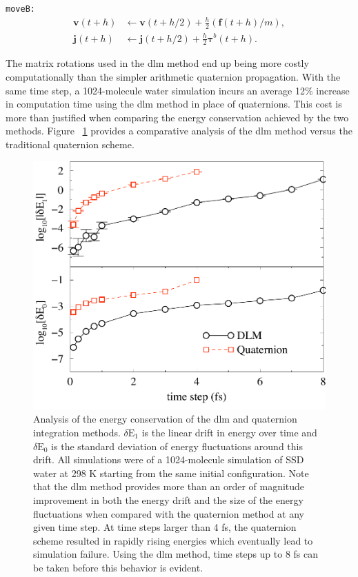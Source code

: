 \documentclass[]{book}
\begin{document}
{\tt moveB:}
\begin{align*}
\mathbf{v}\left(t + h \right)  &\leftarrow  \mathbf{v}\left(t + h / 2 \right) 
	+ \frac{h}{2} \left( \mathbf{f}(t + h) / m \right), \\
%
\mathbf{j}\left(t + h \right)  &\leftarrow \mathbf{j}\left(t + h / 2 \right) 
	+ \frac{h}{2} \mathbf{\tau}^b(t + h) .
\end{align*}

The matrix rotations used in the {\sc dlm} method end up being more
costly computationally than the simpler arithmetic quaternion
propagation. With the same time step, a 1024-molecule water simulation
incurs an average 12\% increase in computation time using the {\sc
dlm} method in place of quaternions. This cost is more than justified
when comparing the energy conservation achieved by the two
methods. Figure ~\ref{quatdlm} provides a comparative analysis of the
{\sc dlm} method versus the traditional quaternion scheme.

\begin{figure}
\centering
\includegraphics[width=\linewidth]{quatvsdlm.pdf}
\caption[Energy conservation analysis of the {\sc dlm} and quaternion 
integration methods]{Analysis of the energy conservation of the {\sc
dlm} and quaternion integration methods.  $\delta \mathrm{E}_1$ is the
linear drift in energy over time and $\delta \mathrm{E}_0$ is the
standard deviation of energy fluctuations around this drift.  All
simulations were of a 1024-molecule simulation of SSD water at 298 K
starting from the same initial configuration. Note that the {\sc dlm}
method provides more than an order of magnitude improvement in both
the energy drift and the size of the energy fluctuations when compared
with the quaternion method at any given time step.  At time steps
larger than 4 fs, the quaternion scheme resulted in rapidly rising
energies which eventually lead to simulation failure.  Using the {\sc
dlm} method, time steps up to 8 fs can be taken before this behavior
is evident.}
\label{quatdlm}
\end{figure}
\end{document}
